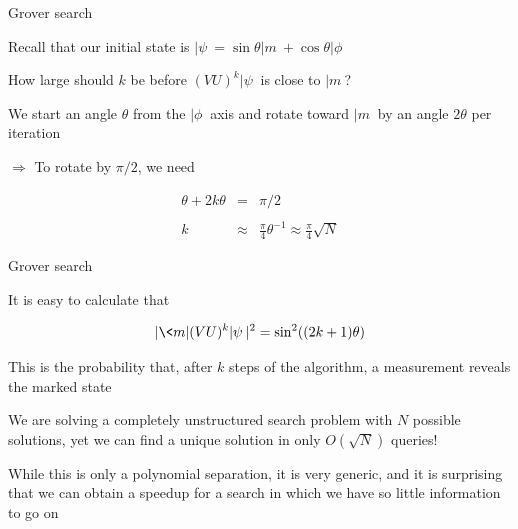 


\begin{frame}{Grover search}

Recall that our initial state is $|\psi\> = \sin\theta|m\> + \cos\theta|\phi\>$

\bigskip
How large should $k$ be before $(VU)^k|\psi\>$ is close to $|m\>$?  

\bigskip
We start an angle $\theta$ from the $|\phi\>$ axis and rotate 
toward $|m\>$ by an angle $2\theta$ per iteration

\bigskip
$\Rightarrow$ To rotate by $\pi/2$, we 
need 

\begin{eqnarray*}
\theta + 2k\theta & =       & \pi/2 \quad \\ & & \\
k                 & \approx & \frac{\pi}{4}\theta^{-1} \approx \frac{\pi}{4} \sqrt{N}
\end{eqnarray*}

\end{frame}




\begin{frame}{Grover search}

It is easy to calculate that 

\medskip
\[
|\<m|(VU)^k|\psi\>|^2 = \sin^2((2k+1)\theta)
\]

\bigskip
This is the probability that, after $k$ steps of the algorithm, a measurement reveals the marked state

\bigskip
We are solving a completely unstructured search problem with $N$ possible solutions, yet we 
can find a unique solution in only $O(\sqrt N)$ queries!  

\bigskip
While this is only a polynomial separation, it is very generic, and it is surprising that we can obtain a speedup for a search in which we have so little 
information to go on

\end{frame}


